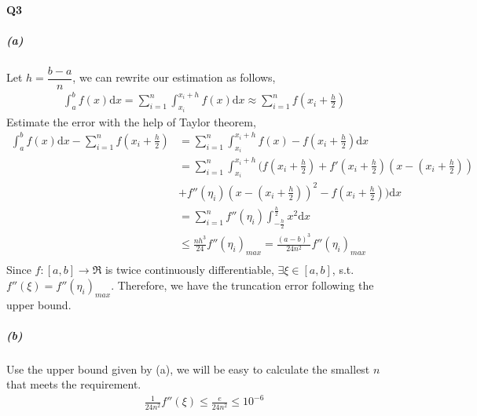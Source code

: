 \documentclass[11pt]{article}
\begin{document}
\paragraph{Q3}
\subparagraph{(a)}
Let $h=\dfrac{b-a}{n}$, we can rewrite our estimation as follows,
\begin{align}
	\int_{a}^{b}f(x)\mathrm{d}x=\sum_{i=1}^{n}\int_{x_i}^{x_i+h}f(x)\mathrm{d}x\approx\sum_{i=1}^{n}f(x_i+\frac{h}{2})
\end{align}
Estimate the error with the help of Taylor theorem,
\begin{align}
	\int_{a}^{b}f(x)\mathrm{d}x-\sum_{i=1}^{n}f(x_i+\frac{h}{2})&=
	\sum_{i=1}^{n}\int_{x_i}^{x_i+h}f(x)-f(x_i+\frac{h}{2})\mathrm{d}x\\
	&=\sum_{i=1}^{n}\int_{x_i}^{x_i+h}(f(x_i+\frac{h}{2})+f'(x_i+\frac{h}{2})(x-(x_i+\frac{h}{2}))\\&+f''(\eta_i)(x-(x_i+\frac{h}{2}))^2-f(x_i+\frac{h}{2}))\mathrm{d}x\\
	&=\sum_{i=1}^{n}f''(\eta_i)\int_{-\frac{h}{2}}^{\frac{h}{2}}x^2\mathrm{d}x\\
	&\le \frac{nh^3}{24}f''(\eta_i)_{max}=\frac{(a-b)^3}{24n^2}f''(\eta_i)_{max}\\
\end{align}
Since $f : [a, b] \rightarrow \Re$ is twice continuously differentiable, $\exists\xi\in[a,b]$, s.t. $f''(\xi)=f''(\eta_i)_{max}$. Therefore, we have the truncation error following the upper bound.
\subparagraph{(b)}
Use the upper bound given by (a), we will be easy to calculate the smallest $n$ that meets the requirement.
\begin{align}
	\frac{1}{24n^2}f''(\xi)\le\frac{e}{24n^2}\le10^{-6}
\end{align}
\begin{figure}[H]
	\centering
\end{figure}
\end{document}

